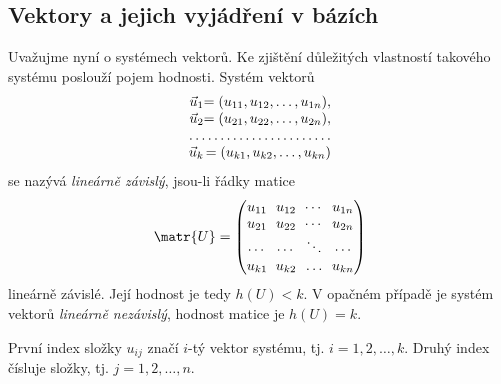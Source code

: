     \subsection{Vektory a jejich vyjádření v bázích}\label{mai:IchapIIsecIVsubI}
      Uvažujme nyní o systémech vektorů. Ke zjištění důležitých vlastností takového systému poslouží
      pojem hodnosti. Systém vektorů
      \[
        \renewcommand{\arraycolsep}{0pt}%
        \begin{array}{rr}
          \vec{u}_1 &= (u_{11}, u_{12}, \ldots, u_{1n}),   \\
          \vec{u}_2 &= (u_{21}, u_{22}, \ldots, u_{2n}),   \\
          \hdotsfor{2} \\
          \vec{u}_k &= (u_{k1}, u_{k2}, \ldots, u_{kn})
        \end{array}
      \]
      se nazývá \emph{lineárně závislý}, jsou-li řádky matice
      \begingroup
        \renewcommand\arraystretch{0.9}
        \renewcommand\arraycolsep{3pt}
        \begin{equation*}
          \matr{U}=
          \begin{pmatrix}
            u_{11} & u_{12} & \cdots & u_{1n}    \\
            u_{21} & u_{22} & \cdots & u_{2n}    \\
            \cdots & \cdots & \ddots & \cdots    \\
            u_{k1} & u_{k2} & \ldots & u_{kn}
          \end{pmatrix}
        \end{equation*}
      \endgroup
      lineárně závislé. Její hodnost je tedy \(h(U) < k\). V opačném případě je systém vektorů
      \emph{lineárně nezávislý}, hodnost matice je \(h(U) = k\).
        
      \begin{tcnote}
        První index složky \(u_{ij}\) značí \(i\)-tý vektor systému, tj. \(i = 1, 2, \ldots, k\).
        Druhý index čísluje složky, tj. \(j = 1, 2, \ldots, n\).
      \end{tcnote}

